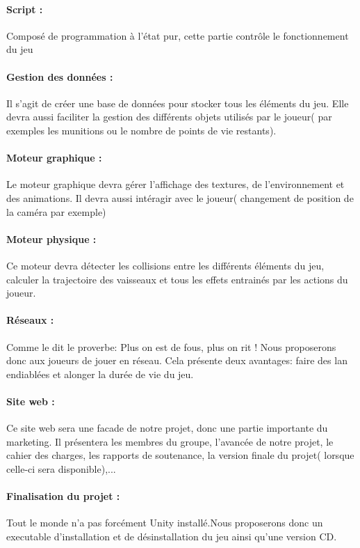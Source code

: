 \documentclass[10pt, titlepage]{report}
\begin{document}
\paragraph{Script :}
Composé de programmation à l'état pur, cette partie contrôle le fonctionnement du jeu

\paragraph{Gestion des données :}
Il s'agit de créer une base de données pour stocker tous les éléments du jeu. Elle devra aussi faciliter la gestion des différents objets utilisés par le joueur( par exemples les munitions ou le nombre de points de vie restants).

\paragraph{Moteur graphique :}
Le moteur graphique devra gérer l'affichage des textures, de l'environnement et des animations. Il devra aussi intéragir avec le joueur( changement de position de la caméra par exemple)

\paragraph{Moteur physique :}
Ce moteur devra détecter les collisions entre les différents éléments du jeu, calculer la trajectoire des vaisseaux et tous les effets entrainés par les actions du joueur.

\paragraph{Réseaux :}
Comme le dit le proverbe: Plus on est de fous, plus on rit ! Nous proposerons donc aux joueurs de jouer en réseau. Cela présente deux avantages: faire des lan endiablées et alonger la durée de vie du jeu.

\paragraph{Site web :}
Ce site web sera une facade de notre projet, donc une partie importante du marketing. Il présentera les membres du groupe, l'avancée de notre projet, le cahier des charges, les rapports de soutenance, la version finale du projet( lorsque celle-ci sera disponible),...

\paragraph{Finalisation du projet :}
Tout le monde n'a pas forcément Unity installé.Nous proposerons donc un executable d'installation et de désinstallation du jeu ainsi qu'une version CD.
\end{document}
